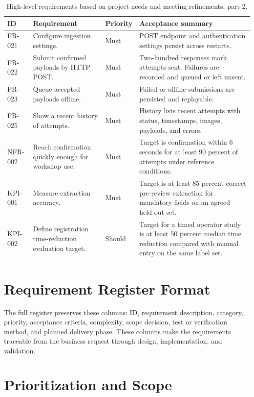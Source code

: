 \begin{table}[htbp]
\small
\centering
\begin{tabularx}{\textwidth}{P{0.09\textwidth}YP{0.10\textwidth}Y}
\toprule
ID & Requirement & Priority & Acceptance summary \\
\midrule
FR-021 & Configure ingestion settings. & Must & POST endpoint and authentication settings persist across restarts. \\
FR-022 & Submit confirmed payloads by HTTP POST. & Must & Two-hundred responses mark attempts sent. Failures are recorded and queued or left unsent. \\
FR-023 & Queue accepted payloads offline. & Must & Failed or offline submissions are persisted and replayable. \\
FR-025 & Show a recent history of attempts. & Must & History lists recent attempts with status, timestamps, images, payloads, and errors. \\
NFR-002 & Reach confirmation quickly enough for workshop use. & Must & Target is confirmation within 6 seconds for at least 90 percent of attempts under reference conditions. \\
KPI-001 & Measure extraction accuracy. & Must & Target is at least 85 percent correct pre-review extraction for mandatory fields on an agreed held-out set. \\
KPI-002 & Define registration time-reduction evaluation target. & Should & Target for a timed operator study is at least 50 percent median time reduction compared with manual entry on the same label set. \\
\bottomrule
\end{tabularx}
\caption{High-level requirements based on project needs and meeting refinements, part 2.}
\end{table}

\section{Requirement Register Format}

The full register preserves these columns: ID, requirement description, category, priority, acceptance criteria, complexity, scope decision, test or verification method, and planned delivery phase. These columns make the requirements traceable from the business request through design, implementation, and validation.

\section{Prioritization and Scope}

